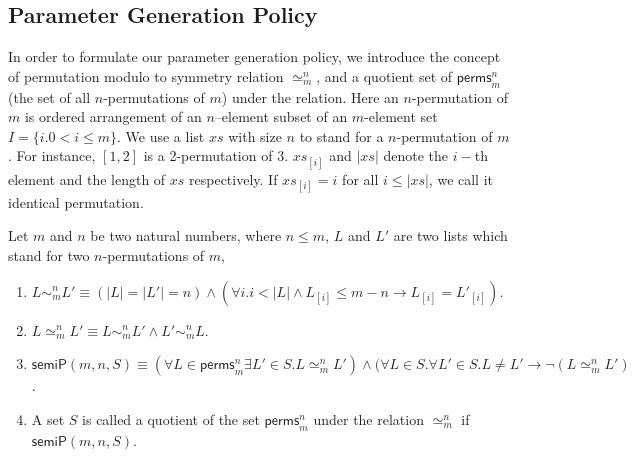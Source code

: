 \documentclass[final]{IEEEtran}
\newcommand\caicomment[1]{\textcolor{red}{comment: #1} }
\begin{document}

\vspace{-0.5cm}
\subsection{Parameter Generation Policy}\label{sec:parameterGenPolicy}
In order to formulate our parameter generation policy, we introduce the concept of permutation modulo to symmetry relation $\simeq_m^n$,  and a quotient set of $\mathsf{perms}_{m}^{n}$ (the set of all $n$-permutations of $m$) under the  relation.  Here an $n$-permutation of $m$ is ordered arrangement of  an $n$--element subset of an $m$-element set $I=\{i. 0<i\le m\}$. We use a list $xs$ with size $n$ to stand for a $n$-permutation of $m$. For instance, $[1,2]$ is a 2-permutation of 3. $xs_{[i]}$ and $|xs|$  denote  the $i-$th element and the length of $xs$ respectively. If $xs_{[i]}=i$ for all $i \le |xs|$, we call it identical permutation. %

\begin{definition}
Let $m$ and $n$ be two natural numbers, where $n \le m$,  $L$ and $L'$ are two lists which stand for two  $n$-permutations of $m$,
\begin{enumerate}
\item
$L \sim_m^n L' \equiv (|L| =|L'|=n) \wedge (\forall i. i<|L| \wedge L_{[i]} \le m-n \longrightarrow L_{[i]}=L'_{[i]}) $.

\item $L \simeq_m^n L' \equiv L \sim_m^n L' \wedge   L' \sim_m^n L$.


\item $\mathsf{semiP}(m,n,S)\equiv (\forall  L \in \mathsf{perms}_{m}^{n} \exists  L' \in S. L \simeq_m^n L' ) \wedge (\forall  L\in S. \forall L'\in S. L \neq L' \longrightarrow \neg  (L \simeq_m^n L' )$.

\item    A set $S$ is called a quotient of the set $\mathsf{perms}_{m}^{n}$ under the relation $\simeq_m^n$ if    $\mathsf{semiP}(m,n,S)$.
\end{enumerate}
\end{definition}
\end{document}
